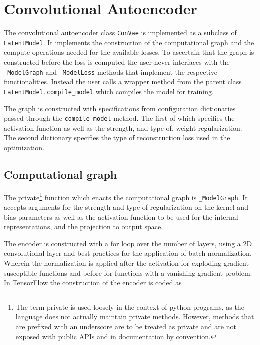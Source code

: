 
\section{Convolutional Autoencoder}\label{sec:convae_implement}

The convolutional autoencoder class \lstinline{ConVae} is implemented as a subclass of \lstinline{LatentModel}. It implements the construction of the computational graph and the compute operations needed for the available losses. To ascertain that the graph is constructed before the loss is computed the user never interfaces with the \lstinline{_ModelGraph} and \lstinline{_ModelLoss} methods that implement the respective functionalities. Instead the user calls a wrapper method from the parent class \lstinline{LatentModel.compile_model} which compiles the model for training.

The graph is constructed with specifications from configuration dictionaries passed through the \lstinline{compile_model} method. The first of which specifies the activation function as well as the strength, and type of, weight regularization. The second dictionary specifies the type of reconstruction loss used in the optimization.

\subsection{Computational graph}

The private\footnote{The term private is used loosely in the context of python programs, as the language does not actually maintain private methods. However, methods that are prefixed with an underscore are to be treated as private and are not exposed with public APIs and in documentation by convention.} function which enacts the computational graph is \lstinline{_ModelGraph}. It accepts arguments for the strength and type of regularization on the kernel and bias parameters as well as the activation function to be used for the internal representations, and the projection to output space. 

The encoder is constructed with a for loop over the number of layers, using a 2D convolutional layer and best practices for the application of batch-normalization. Wherein the normalization is applied after the activation for exploding-gradient susceptible functions and before for functions with a vanishing gradient problem. In TensorFlow the construction of the encoder is coded as 


